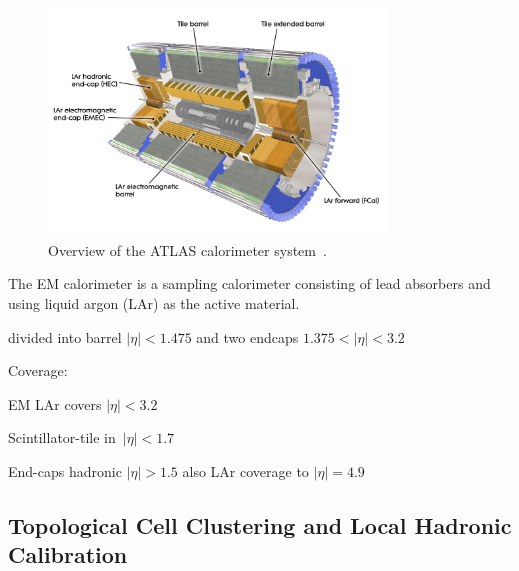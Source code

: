 \begin{figure}[htb]
  \centering
  \includegraphics[width=0.8\textwidth]{./figures/atlas/calorimeter.jpg}
  \caption{Overview of the ATLAS calorimeter system~\cite{calo_fig}.}
  \label{fig:atlas_calo}
\end{figure}

The EM calorimeter is a sampling calorimeter consisting of lead absorbers and
using liquid argon (LAr) as the active material.

divided into barrel $|\eta| < 1.475$ and two endcaps
$1.375 < |\eta| < 3.2$~\cite{atlas_detector}




Coverage:

EM LAr covers $|\eta|< 3.2$

Scintillator-tile in~$|\eta| < 1.7$

End-caps hadronic $|\eta| > 1.5$ also LAr coverage to $|\eta| = 4.9$



\subsection{Topological Cell Clustering and Local Hadronic Calibration}

\cite{atlas_topoclustering}


